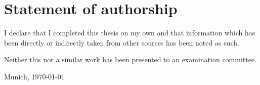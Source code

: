\documentclass[12pt]{article}
\begin{document}
	\pagebreak
		
		
		
		
		
		
	\newpage
	\thispagestyle{empty}
	\clearpage
	
	\section*{Statement of authorship}
	I declare that I completed this thesis on my own and that information which has been
	directly or indirectly taken from other sources has been noted as such.\par \bigskip
	\noindent Neither this nor a similar work has been presented to an examination committee.
	
	\vspace{3cm}
	
	Munich, \today \hspace{2cm}\hrulefill
%	
%	
%	
%	
\end{document}
